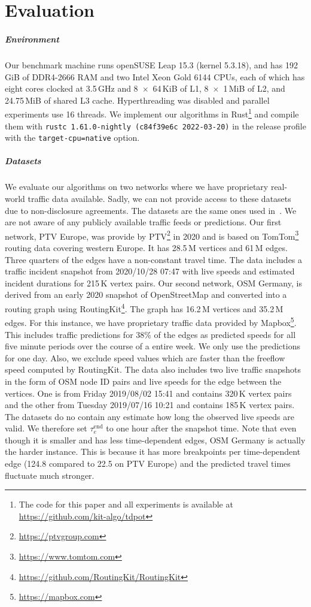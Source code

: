 \documentclass[a4paper,UKenglish,cleveref, autoref, thm-restate,anonymous]{lipics-v2021}
\begin{document}
\section{Evaluation}
\subparagraph{Environment} Our benchmark machine runs openSUSE Leap 15.3 (kernel 5.3.18), and has 192\,GiB of DDR4-2666 RAM and two Intel Xeon Gold 6144 CPUs, each of which has eight cores clocked at 3.5\,GHz and 8~$\times$~64\,KiB of L1, 8~$\times$~1\,MiB of L2, and 24.75\,MiB of shared L3 cache.
Hyperthreading was disabled and parallel experiments use 16 threads.
We implement our algorithms in Rust\footnote{The code for this paper and all experiments is available at \url{https://github.com/kit-algo/tdpot}} and compile them with \texttt{rustc 1.61.0-nightly (c84f39e6c 2022-03-20)} in the release profile with the \texttt{target-cpu=native} option.

\subparagraph{Datasets}
We evaluate our algorithms on two networks where we have proprietary real-world traffic data available.
Sadly, we can not provide access to these datasets due to non-disclosure agreements.
The datasets are the same ones used in~\cite{swz-sfert-21,strasser_et_al:LIPIcs.SEA.2021.6}.
We are not aware of any publicly available traffic feeds or predictions.
%
Our first network, PTV Europe, was provide by PTV\footnote{\url{https://ptvgroup.com}} in 2020 and is based on TomTom\footnote{\url{https://www.tomtom.com}} routing data covering western Europe.
It has 28.5\,M vertices and 61\,M edges.
Three quarters of the edges have a non-constant travel time.
The data includes a traffic incident snapshot from 2020/10/28 07:47 with live speeds and estimated incident durations for 215\,K vertex pairs.
%
Our second network, OSM Germany, is derived from an early 2020 snapshot of OpenStreetMap and converted into a routing graph using RoutingKit\footnote{\url{https://github.com/RoutingKit/RoutingKit}}.
The graph has 16.2\,M vertices and 35.2\,M edges.
For this instance, we have proprietary traffic data provided by Mapbox\footnote{\url{https://mapbox.com}}.
This includes traffic predictions for 38\% of the edges as predicted speeds for all five minute periods over the course of a entire week.
We only use the predictions for one day.
Also, we exclude speed values which are faster than the freeflow speed computed by RoutingKit.
The data also includes two live traffic snapshots in the form of OSM node ID pairs and live speeds for the edge between the vertices.
One is from Friday 2019/08/02 15:41 and contains 320\,K vertex pairs and the other from Tuesday 2019/07/16 10:21 and contains 185\,K vertex pairs.
The datasets do no contain any estimate how long the observed live speeds are valid.
We therefore set $\tau_e^{\operatorname{end}}$ to one hour after the snapshot time.
Note that even though it is smaller and has less time-dependent edges, OSM Germany is actually the harder instance.
This is because it has more breakpoints per time-dependent edge (124.8 compared to 22.5 on PTV Europe) and the predicted travel times fluctuate much stronger.
\end{document}
